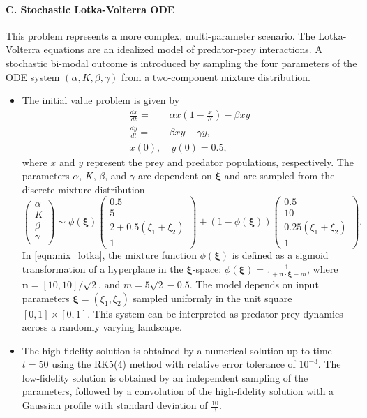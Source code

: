 \documentclass[preprint,10pt]{elsarticle}
\begin{document}
\paragraph{C. Stochastic Lotka-Volterra ODE}
This problem represents a more complex, multi-parameter scenario. The Lotka-Volterra equations are an idealized model of predator-prey interactions. A stochastic bi-modal outcome is introduced by sampling the four parameters of the ODE system $(\alpha, K, \beta, \gamma)$ from a two-component mixture distribution. 
%
\begin{itemize}
    \item The initial value problem is given by
    \begin{align}
\frac{dx}{dt} =& \alpha x \left(1 - \frac{x}{K}\right) - \beta x y \\ 
\frac{dy}{dt} =& \beta x y - \gamma y, \\
x(0), & \ y(0) = 0.5,
\end{align}
where $x$ and $y$ represent the prey and predator populations, respectively. The parameters $\alpha$, $K$, $\beta$, and $\gamma$ are dependent on $\bm\xi$ and are sampled from the discrete mixture distribution
%
\begin{equation}
\label{eqn:mix_lotka}
\begin{pmatrix}
    \alpha \\
    K \\
    \beta \\
    \gamma
\end{pmatrix}
\sim \phi(\bm\xi)
\begin{pmatrix}
    0.5 \\
    5 \\
    2 + 0.5(\xi_1 + \xi_2) \\
    1
\end{pmatrix}
+ (1 - \phi(\bm\xi))
\begin{pmatrix}
    0.5 \\
    10 \\
    0.25(\xi_1 + \xi_2) \\
    1
\end{pmatrix}.
\end{equation}
In \eqref{eqn:mix_lotka}, the mixture function $\phi(\bm\xi)$ is defined as a sigmoid transformation of a hyperplane in the $\bm\xi$-space: $ \phi(\bm\xi) = \frac{1}{1 + \bm n \cdot \bm\xi - m}$,
where $\bm n = [10, 10] / \sqrt{2}$, and $m=5\sqrt{2} - 0.5$. The model depends on input parameters $\boldsymbol{\xi} = (\xi_1, \xi_2)$ sampled uniformly in the unit square $[0,1] \times [0,1]$. This system can be interpreted as predator-prey dynamics across a randomly varying landscape.

    \item The high-fidelity solution is obtained by a numerical solution up to time $t=50$ using the RK5(4) method with relative error tolerance of $10^{-3}$. The low-fidelity solution is obtained by an independent sampling of the parameters, followed by a convolution of the high-fidelity solution with a Gaussian profile with standard deviation of $\frac{10}{3}$.
\end{itemize}
\end{document}
